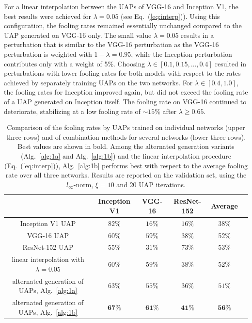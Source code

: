 \documentclass[runningheads]{llncs}
\begin{document}
For a linear interpolation between the UAPs of VGG-16 and Inception V1, the best results were achieved for \(\lambda=0.05\) (see Eq.~(\ref{eq:interp})). Using this configuration, the fooling rates remained essentially unchanged compared to the UAP generated on VGG-16 only.
The small value \(\lambda=0.05\) results in a perturbation that is similar to the VGG-16 perturbation as the VGG-16 perturbation is weighted with \(1-\lambda=0.95\), while the Inception perturbation contributes only with a weight of 5\%. Choosing \(\lambda\in\left[0.1,0.15,\ldots,0.4\right]\) resulted in perturbations with lower fooling rates for both models with respect to the rates achieved by separately training UAPs on the two networks. For \(\lambda \in\left[0.4,1.0\right]\), the fooling rates for Inception improved again, but did not exceed the fooling rate of a UAP generated on Inception itself. The fooling rate on VGG-16 continued to deteriorate, stabilizing at a low fooling rate of \(\sim 15\%\) after \(\lambda\geq 0.65\).
\begin{table}
\centering

\begin{tabular}{|c|c|c|c|c|c|}
\hline
											&	Inception	V1&	VGG-16		&	ResNet-152	& Average	\\ \hline
Inception V1 UAP							&	\(82\%\)		&	\(16\%\)	&	\(16\%\)	&38\%	\\
VGG-16 UAP								&	\(60\%\)		&	\(59\%\)	&	\(38\%\)	&52\%	\\
ResNet-152 UAP &	\(55\%\)		&	\(31\%\)	&	\(73\%\)&53\%		\\ \hline
linear interpolation with \(\lambda=0.05\)	&	\(60\%\)		&	\(59\%\)	&	\(38\%\)	&52\%\\
alternated generation of UAPs, Alg.~\ref{alg:1a}&	\(63\%\)		&	\(55\%\)	&	\(36\%\)	& \(51\%\)	\\
alternated generation of UAPs, Alg.~\ref{alg:1b}&	\(\mathbf{67}\%\)		&	\(\mathbf{61}\%\)	&	\(\mathbf{41}\%\)		&\(\mathbf{56}\)\%\\

\hline 
\end{tabular}

\caption{Comparison of the fooling rates by UAPs trained on individual networks (upper three rows) and of combination methods for several networks (lower three rows). Best values are shown in bold. Among the alternated generation variants (Alg.~\ref{alg:1a} and Alg.~\ref{alg:1b}) and the linear interpolation procedure (Eq.~(\ref{eq:interp})), Alg.~\ref{alg:1b} performs best with respect to the average fooling rate over all three networks. Results are reported on the validation set, using the $l_\infty$-norm, $\xi=10$ and 20 UAP iterations.}\label{tab:vergleich_comb}
\end{table}
\end{document}

